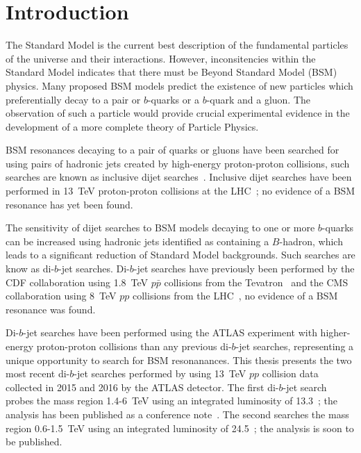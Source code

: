\chapter{Introduction}
\label{sec:int}

The Standard Model is the current best description of the fundamental particles of the universe and their interactions.
However, inconsitencies within the Standard Model indicates that
there must be Beyond Standard Model (BSM) physics.
Many proposed BSM models predict the existence of new particles
which preferentially decay to a pair or $b$-quarks or a $b$-quark and a gluon.
The observation of such a particle would provide crucial experimental
evidence in the development of a more complete theory of Particle Physics.


BSM resonances decaying to a pair of quarks or gluons
have been searched for using pairs of hadronic jets created
by high-energy proton-proton collisions, such searches are known as inclusive dijet searches~\cite{theo-dijet_harris}.
Inclusive dijet searches have been performed in 13~TeV proton-proton collisions at the LHC~\cite{dijet-mori16_paper,dijet-mori17_paper,dijet-cms};
no evidence of a BSM resonance has yet been found.

The sensitivity of dijet searches to BSM models decaying to one or more $b$-quarks can be increased
using hadronic jets identified as containing a $B$-hadron,
which leads to a significant reduction of Standard Model backgrounds.
Such searches are know as di-$b$-jet searches.
Di-$b$-jet searches have previously been performed by
the CDF collaboration using 1.8~TeV $p\bar{p}$ collisions from the Tevatron~\cite{dibjet-cdf}
and the CMS collaboration using 8~TeV $pp$ collisions from the LHC~\cite{dibjet-cms},
no evidence of a BSM resonance was found.

Di-$b$-jet searches have been performed using the ATLAS experiment
with higher-energy proton-proton collisions than any previous \mbox{di-$b$-jet} searches,
representing a unique opportunity to search for BSM resonanances.
This thesis presents the two most recent di-$b$-jet searches performed by using
13~TeV $pp$ collision data collected in 2015 and 2016 by the ATLAS detector.
The first di-$b$-jet search probes the mass region 1.4-6~TeV using an integrated luminosity of 13.3~\ifb{};
the analysis has been published as a conference note~\cite{dibjet-ichep_conf}.
The second searches the mass region 0.6-1.5~TeV using an integrated luminosity of 24.5~\ifb{};
the analysis is soon to be published.

